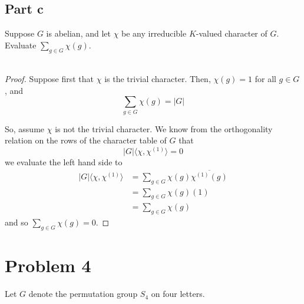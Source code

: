 \documentclass[12pt,reqno]{amsart}
\begin{document}
\subsection*{Part c}
Suppose $G$ is abelian, and let $\chi$ be any irreducible $K$-valued character
of $G$. Evaluate $\sum_{g\in G}\chi(g)$.
\\
\\
\begin{proof}
    Suppose first that $\chi$ is the trivial character. Then, $\chi(g) = 1$ for
    all $g\in G$, and
    \[
        \sum_{g\in G}\chi(g) = |G|
    \]
    
    So, assume $\chi$ is not the trivial character.
    We know from the orthogonality relation on the rows of the character table
    of $G$ that
    \[
        |G|\langle \chi,\chi^{(1)}\rangle = 0
    \]
    we evaluate the left hand side to
    \[
        \begin{aligned}
            |G|\langle \chi,\chi^{(1)}\rangle 
            &= \sum_{g\in G}\chi(g)\overline{\chi^{(1)}(g)}\\
            &= \sum_{g\in G}\chi(g)(1)\\
            &= \sum_{g\in G} \chi(g)
        \end{aligned}
    \]
    and so $\sum_{g\in G}\chi(g) = 0$.
\end{proof}

\newpage

\section*{Problem 4}
Let $G$ denote the permutation group $S_4$ on four letters.
\end{document}

